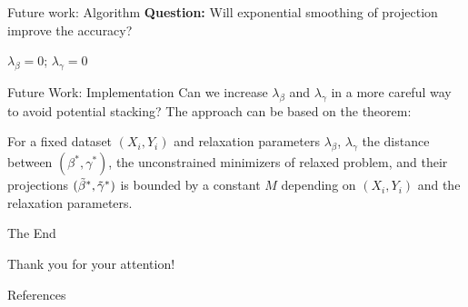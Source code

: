 \documentclass[8pt]{beamer}
\begin{document}
\begin{frame}{Future work: Algorithm}
	\textbf{Question:} Will exponential smoothing of projection improve the accuracy? 
	{\small
	\begin{algorithm}[H]
	$\lambda_\beta = 0$; $\lambda_\gamma = 0$ \\
	\BlankLine
	\end{algorithm}
	}
	\end{frame}
	
\begin{frame}{Future Work: Implementation}
		Can we increase $\lambda_\beta$ and $\lambda_\gamma$ in a more careful way to avoid potential stacking? 
		The approach can be based on the theorem:
		\begin{theorem}
	For a fixed dataset $(X_i, Y_i)$ and relaxation parameters $\lambda_\beta$, $\lambda_\gamma$ the distance between $(\beta^*, \gamma^*)$, the unconstrained minimizers of relaxed problem, and their projections $(\tilde\beta^*, \tilde\gamma^*)$ is bounded by a constant $M$ depending on $(X_i, Y_i)$ and the relaxation parameters.
		\end{theorem}
\end{frame}

\begin{frame}{The End}
	\begin{center}
		\large Thank you for your attention!
	\end{center}
\end{frame}


\begin{frame}[allowframebreaks]{References}

  
  

\end{frame}
\end{document}
